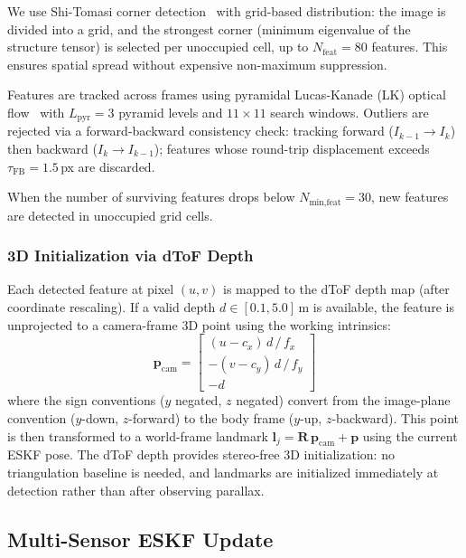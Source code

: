 We use Shi-Tomasi corner detection~\cite{shi1994good} with grid-based distribution: the image is divided into a grid, and the strongest corner (minimum eigenvalue of the structure tensor) is selected per unoccupied cell, up to $N_\text{feat} = 80$ features.
This ensures spatial spread without expensive non-maximum suppression.

Features are tracked across frames using pyramidal Lucas-Kanade (LK) optical flow~\cite{lucas1981iterative,bouguet2001pyramidal} with $L_\text{pyr} = 3$ pyramid levels and $11 \times 11$ search windows.
Outliers are rejected via a forward-backward consistency check: tracking forward ($I_{k-1} \to I_k$) then backward ($I_k \to I_{k-1}$); features whose round-trip displacement exceeds $\tau_\text{FB} = 1.5$\,px are discarded.

When the number of surviving features drops below $N_\text{min,feat} = 30$, new features are detected in unoccupied grid cells.

\subsubsection{3D Initialization via dToF Depth}

Each detected feature at pixel $(u,v)$ is mapped to the dToF depth map (after coordinate rescaling).
If a valid depth $d \in [0.1, 5.0]$\,m is available, the feature is unprojected to a camera-frame 3D point using the working intrinsics:
\begin{equation}
    \mathbf{p}_\text{cam} = \begin{bmatrix}
        (u - c_x)\,d\,/\,f_x \\[2pt]
        -(v - c_y)\,d\,/\,f_y \\[2pt]
        -d
    \end{bmatrix}
    \label{eq:vis_unproj}
\end{equation}
where the sign conventions ($y$ negated, $z$ negated) convert from the image-plane convention ($y$-down, $z$-forward) to the body frame ($y$-up, $z$-backward).
This point is then transformed to a world-frame landmark $\mathbf{l}_j = \mathbf{R}\,\mathbf{p}_\text{cam} + \mathbf{p}$ using the current ESKF pose.
The dToF depth provides stereo-free 3D initialization: no triangulation baseline is needed, and landmarks are initialized immediately at detection rather than after observing parallax.

\subsection{Multi-Sensor ESKF Update}
\label{sec:multi_update}

